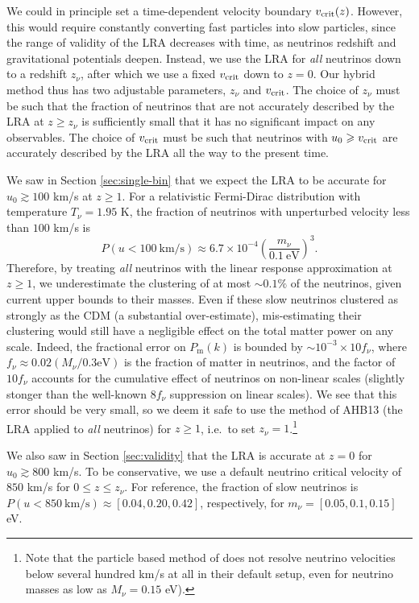 \documentclass[useAMS, usenatbib]{mnras}
\newcommand{\beq}{\begin{equation}}
\newcommand{\eeq}{\end{equation}}
\begin{document}
We could in principle set a time-dependent velocity boundary $v_{\rm crit}(z)$. However, this would require constantly converting fast particles into slow particles, since the range of validity of the LRA decreases with time, as neutrinos redshift and gravitational potentials deepen. Instead, we use the LRA for \emph{all} neutrinos down to a redshift $z_\nu$, after which we use a fixed $v_{\rm crit}$ down to $z = 0$. Our hybrid method thus has two adjustable parameters, $z_\nu$ and $v_{\rm crit}$. The choice of $z_\nu$ must be such that the fraction of neutrinos that are not accurately described by the LRA at $z \geq z_\nu$ is sufficiently small that it has no significant impact on any observables. The choice of $v_{\rm crit}$ must be such that neutrinos with $u_0 \geq v_{\rm crit}$ are accurately described by the LRA all the way to the present time.

We saw in Section \ref{sec:single-bin} that we expect the LRA to be accurate for $u_0 \gtrsim 100$ km/s at $z \geq 1$. For a relativistic Fermi-Dirac distribution with temperature $T_\nu = 1.95$ K, the fraction of neutrinos with unperturbed velocity less than $100$ km/s is
\beq
P(u < 100 ~\textrm{km/s}) \approx 6.7 \times 10^{-4} \left(\frac{m_{\nu}}{0.1~\textrm{eV}}\right)^3.
\eeq
Therefore, by treating \emph{all} neutrinos with the linear response approximation at $z \geq 1$, we underestimate the clustering of at most $\sim 0.1\%$ of the neutrinos, given current upper bounds to their masses.
Even if these slow neutrinos clustered as strongly as the CDM (a substantial over-estimate), mis-estimating their clustering would still have a negligible effect on the total matter power on any scale. Indeed, the fractional error on $P_\mathrm{m}(k)$ is bounded by $\sim 10^{-3} \times 10 f_{\nu}$, where $f_\nu \approx 0.02 (M_\nu/0.3 \textrm{eV})$ is the fraction of matter in neutrinos, and the factor of $10 f_\nu$ accounts for the cumulative effect of neutrinos on non-linear scales (slightly stonger than the well-known $8 f_\nu$ suppression on linear scales). We see that this error should be very small, so we deem it safe to use the method of AHB13 (the LRA applied to \emph{all} neutrinos) for $z \geq 1$, i.e.~to set $z_\nu = 1$.\footnote{Note that the particle based method of \cite{Banerjee_2018} does not resolve neutrino velocities below several hundred km/s at all in their default setup, even for neutrino masses as low as $M_\nu = 0.15$ eV).}

We also saw in Section \ref{sec:validity} that the LRA is accurate at $z = 0$ for $u_0 \gtrsim 800$ km/s. To be conservative, we use a default neutrino critical velocity of $850$ km/s for $0 \leq z \leq z_\nu$. For reference, the fraction of slow neutrinos is $P(u < 850 ~\textrm{km/s}) \approx [0.04, 0.20, 0.42]$, respectively, for  $m_{\nu} = [0.05, 0.1, 0.15]$ eV.
\end{document}
